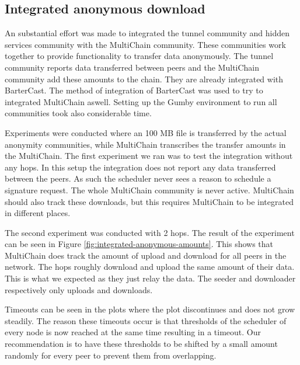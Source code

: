 \subsection{Integrated anonymous download}
An substantial effort was made to integrated the tunnel community and hidden services community with the MultiChain community.
These communities work together to provide functionality to transfer data anonymously.
The tunnel community reports data transferred between peers and the MultiChain community add these amounts to the chain.
They are already integrated with BarterCast.
The method of integration of BarterCast was used to try to integrated MultiChain aswell.
Setting up the Gumby environment to run all communities took also considerable time.

Experiments were conducted where an 100 MB file is transferred by the actual anonymity communities,
while MultiChain transcribes the transfer amounts in the MultiChain.
The first experiment we ran was to test the integration without any hops.
In this setup the integration does not report any data transferred between the peers.
As such the scheduler never sees a reason to schedule a signature request.
The whole MultiChain community is never active.
MultiChain should also track these downloads,
but this requires MultiChain to be integrated in different places.

The second experiment was conducted with 2 hops.
The result of the experiment can be seen in Figure \ref{fig:integrated-anonymous-amounts}.
This shows that MultiChain does track the amount of upload and download for all peers in the network.
The hops roughly download and upload the same amount of their data.
This is what we expected as they just relay the data.
The seeder and downloader respectively only uploads and downloads.

Timeouts can be seen in the plots where the plot discontinues and does not grow steadily.
The reason these timeouts occur is that thresholds of the scheduler of every node is now reached at the same time resulting in a timeout.
Our recommendation is to have these thresholds to be shifted by a small amount randomly for every peer
to prevent them from overlapping.

